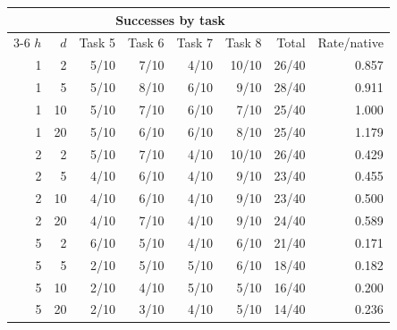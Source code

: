 \begin{tabular}{@{}rrrrrrrr@{}}
\toprule
 & & \multicolumn{4}{c}{Successes by task} & & \\
\cmidrule(lr){3-6}
$h$ & $d$ & Task 5 & Task 6 & Task 7 & Task 8 & Total & Rate/native\\
\midrule
1 & 2 & 5/10 & 7/10 & 4/10 & 10/10 & 26/40 & 0.857\\
1 & 5 & 5/10 & 8/10 & 6/10 & 9/10 & 28/40 & 0.911\\
1 & 10 & 5/10 & 7/10 & 6/10 & 7/10 & 25/40 & 1.000\\
1 & 20 & 5/10 & 6/10 & 6/10 & 8/10 & 25/40 & 1.179\\
2 & 2 & 5/10 & 7/10 & 4/10 & 10/10 & 26/40 & 0.429\\
2 & 5 & 4/10 & 6/10 & 4/10 & 9/10 & 23/40 & 0.455\\
2 & 10 & 4/10 & 6/10 & 4/10 & 9/10 & 23/40 & 0.500\\
2 & 20 & 4/10 & 7/10 & 4/10 & 9/10 & 24/40 & 0.589\\
5 & 2 & 6/10 & 5/10 & 4/10 & 6/10 & 21/40 & 0.171\\
5 & 5 & 2/10 & 5/10 & 5/10 & 6/10 & 18/40 & 0.182\\
5 & 10 & 2/10 & 4/10 & 5/10 & 5/10 & 16/40 & 0.200\\
5 & 20 & 2/10 & 3/10 & 4/10 & 5/10 & 14/40 & 0.236\\
\bottomrule
\end{tabular}

